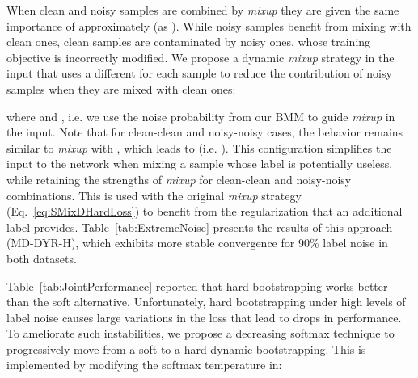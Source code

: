 \documentclass{article}
\begin{document}
When clean and noisy samples
are combined by \emph{mixup} they are given the same importance of approximately
 (as ). While noisy samples
benefit from mixing with clean ones, clean samples are contaminated by 
noisy ones, whose training objective is incorrectly modified.
We propose a dynamic \emph{mixup} strategy in the input
that uses a different  for each sample to reduce the contribution
of noisy samples when they are mixed with clean ones: 

where  and ,
i.e. we use the noise probability from our BMM to guide \emph{mixup}
in the input. Note that for clean-clean and noisy-noisy cases, the behavior remains similar to \emph{mixup} with ,
which leads to  (i.e. 
).
This configuration simplifies the input to the network when mixing a sample whose label is potentially useless, 
while retaining the strengths of \emph{mixup} for clean-clean and 
noisy-noisy combinations. This is used with the original \emph{mixup} strategy (Eq.~\eqref{eq:SMixDHardLoss})
to benefit from the regularization that an additional
label provides. Table~\ref{tab:ExtremeNoise} presents the results
of this approach (MD-DYR-H), which exhibits more stable convergence for 90\% 
label noise in both datasets.

Table~\ref{tab:JointPerformance} reported that hard bootstrapping
works better than the soft alternative. Unfortunately, hard
bootstrapping under high levels of label noise causes large variations
in the loss that lead to drops in performance. To ameliorate such instabilities,
we propose a decreasing softmax technique \cite{2005_ECML_DecreasingSoftMax}
to progressively move from a soft to a hard dynamic bootstrapping.
This is implemented by modifying the softmax temperature 
in: 
\end{document}
